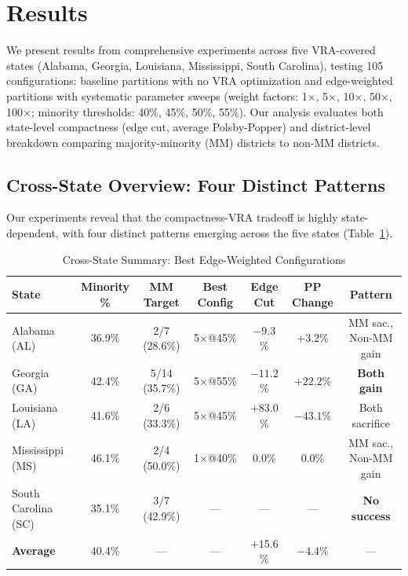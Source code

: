 
\section{Results}

We present results from comprehensive experiments across five VRA-covered states (Alabama, Georgia, Louisiana, Mississippi, South Carolina), testing 105 configurations: baseline partitions with no VRA optimization and edge-weighted partitions with systematic parameter sweeps (weight factors: 1×, 5×, 10×, 50×, 100×; minority thresholds: 40\%, 45\%, 50\%, 55\%). Our analysis evaluates both state-level compactness (edge cut, average Polsby-Popper) and district-level breakdown comparing majority-minority (MM) districts to non-MM districts.

\subsection{Cross-State Overview: Four Distinct Patterns}

Our experiments reveal that the compactness-VRA tradeoff is highly state-dependent, with four distinct patterns emerging across the five states (Table~\ref{tab:cross-state-summary}).

\begin{table}[htbp]
\centering
\caption{Cross-State Summary: Best Edge-Weighted Configurations}
\label{tab:cross-state-summary}
\begin{tabular}{lcccccc}
\toprule
\textbf{State} & \textbf{Minority \%} & \textbf{MM Target} & \textbf{Best Config} & \textbf{Edge Cut} & \textbf{PP Change} & \textbf{Pattern} \\
\midrule
Alabama (AL)    & 36.9\% & 2/7 (28.6\%) & 5×@45\% & $-9.3$\% & $+3.2$\% & MM sac., Non-MM gain \\
Georgia (GA)    & 42.4\% & 5/14 (35.7\%) & 5×@55\% & $-11.2$\% & $+22.2$\% & \textbf{Both gain} \\
Louisiana (LA)  & 41.6\% & 2/6 (33.3\%) & 5×@45\% & $+83.0$\% & $-43.1$\% & Both sacrifice \\
Mississippi (MS) & 46.1\% & 2/4 (50.0\%) & 1×@40\% & $0.0$\% & $0.0$\% & MM sac., Non-MM gain \\
South Carolina (SC) & 35.1\% & 3/7 (42.9\%) & --- & --- & --- & \textbf{No success} \\
\midrule
\textbf{Average} & 40.4\% & --- & --- & $+15.6$\% & $-4.4$\% & --- \\
\bottomrule
\end{tabular}
\end{table}

